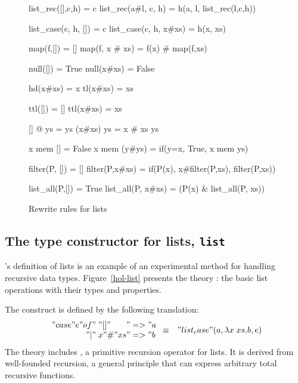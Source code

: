 \begin{figure}
\begin{ttbox}\makeatother
{}    list_rec([],c,h) = c  
   list_rec(a#l, c, h) = h(a, l, list_rec(l,c,h))

   list_case(c, h, []) = c 
  list_case(c, h, x#xs) = h(x, xs)

         map(f,[]) = []
        map(f, x \# xs) = f(x) \# map(f,xs)

        null([]) = True
       null(x#xs) = False

         hd(x#xs) = x
         tl(x#xs) = xs

         ttl([]) = []
        ttl(x#xs) = xs

      [] @ ys = ys
     (x#xs) \at ys = x # xs \at ys

         x mem [] = False
        x mem (y#ys) = if(y=x, True, x mem ys)

      filter(P, []) = []
     filter(P,x#xs) = if(P(x), x#filter(P,xs), filter(P,xs))

    list_all(P,[]) = True
   list_all(P, x#xs) = (P(x) & list_all(P, xs))
\end{ttbox}
\caption{Rewrite rules for lists} \label{hol-list-simps}
\end{figure}


\subsection{The type constructor for lists, {\tt list}}

\HOL's definition of lists is an example of an experimental method for
handling recursive data types.  Figure~\ref{hol-list} presents the theory
: the basic list operations with their types and properties.

The  construct is defined by the following translation:
{\dquotes
\begin{eqnarray*}
  \begin{array}{r@{\;}l@{}l}
  "case " e " of" & "[]"    & " => " a\\
              "|" & x"\#"xs & " => " b
  \end{array} 
  & \equiv &
  "list_case"(a, \lambda x\;xs.b, e)
\end{eqnarray*}}%
The theory includes , a primitive recursion operator
for lists.  It is derived from well-founded recursion, a general principle
that can express arbitrary total recursive functions.


